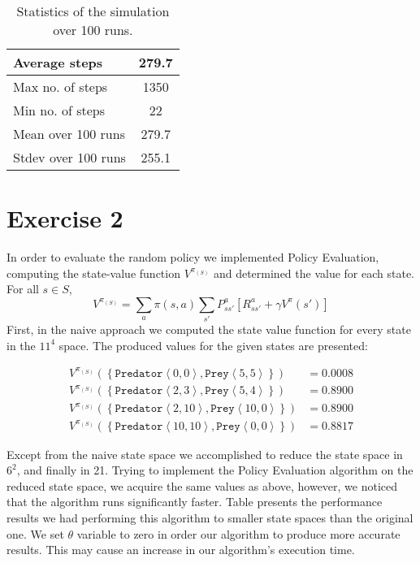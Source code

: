 \documentclass[a4paper,11pt]{article}
\newcommand{\Pred}[2]{\ensuremath{\mathtt{Predator}\left<#1, #2\right>}}
\newcommand{\Prey}[2]{\ensuremath{\mathtt{Prey}\left<#1, #2\right>}}
\begin{document}
\begin{table}[h!]
\caption{Statistics of the simulation over 100 runs.}
\label{tab:SimStat}
\begin{center}
\begin{small}
\begin{tabular}{|@{ }l@{ }|@{ }c@{ }|}
    \hline
     	Average steps & 279.7 \\ \hline
  		Max no. of steps & 1350   \\ \hline
  		Min no. of steps & 22	\\ \hline
  		Mean over 100 runs & 279.7	\\ \hline
  		Stdev over 100 runs & 255.1	\\
    \hline
    \end{tabular}      
\end{small}
\end{center}	
\end{table}





\section*{Exercise 2}
In order to evaluate the random policy we implemented Policy Evaluation, computing the state-value function $V^{\pi_{(S)}}$ and determined the value for each state. For all $s \in S$,
\[
V^{\pi_{(S)}} = \sum_{a}\pi(s,a)\sum_{s'}P_{ss'}^a[R_{ss'}^a + \gamma V^{\pi}(s')]
\]
First, in the naive approach we computed the state value function for every state in the $11^{4}$ space. The produced values for the given states are presented:

\begin{align*}
	V^{\pi_{(S)}}(\left\{\Pred{0}{0},\Prey{5}{5}\right\})   & = 0.0008 \\
    V^{\pi_{(S)}}(\left\{\Pred{2}{3},\Prey{5}{4}\right\})   &= 0.8900 \\
    V^{\pi_{(S)}}(\left\{\Pred{2}{10},\Prey{10}{0}\right\}) &= 0.8900 \\
    V^{\pi_{(S)}}(\left\{\Pred{10}{10},\Prey{0}{0}\right\}) &= 0.8817
\end{align*}

Except from the naive state space we accomplished to reduce the state space in $6^2$, and finally in 21. Trying to implement the Policy Evaluation algorithm on the reduced state space, we acquire the same values as above, however, we noticed that the algorithm runs significantly faster. Table presents the performance results we had performing this algorithm to smaller state spaces than the original one. We set $\theta$ variable to zero in order our algorithm to produce more accurate results. This may cause an increase in our algorithm's execution time.
\end{document}
